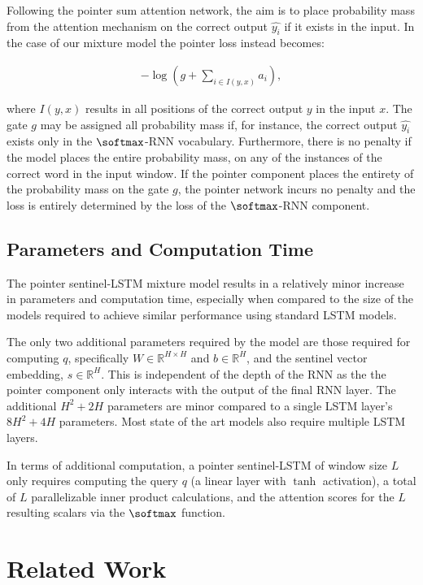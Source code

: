 Following the pointer sum attention network, the aim is to place probability mass from the attention mechanism on the correct output $\hat{y_{i}}$ if it exists in the input. In the case of our mixture model the pointer loss instead becomes:

\begin{align}
- \log \left( g + \sum_{i \in I(y, x)} a_i\right),
\end{align}

where $I(y, x)$ results in all positions of the correct output $y$ in the input $x$. The gate $g$ may be assigned all probability mass if, for instance, the correct output $\hat{y_{i}}$ exists only in the $\softmax$-RNN vocabulary. Furthermore, there is no penalty if the model places the entire probability mass, on any of the instances of the correct word in the input window. If the pointer component places the entirety of the probability mass on the gate $g$, the pointer network incurs no penalty and the loss is entirely determined by the loss of the $\softmax$-RNN component.

\subsection{Parameters and Computation Time}

The pointer sentinel-LSTM mixture model results in a relatively minor increase in parameters and computation time, especially when compared to the size of the models required to achieve similar performance using standard LSTM models.

The only two additional parameters required by the model are those required for computing $q$, specifically $W \in \mathbb{R}^{H \times H}$ and $b \in \mathbb{R}^{H}$, and the sentinel vector embedding, $s \in \mathbb{R}^{H}$.
This is independent of the depth of the RNN as the the pointer component only interacts with the output of the final RNN layer. The additional $H ^ 2 + 2H$ parameters are minor compared to a single LSTM layer's $8 H^2 + 4H$ parameters. Most state of the art models also require multiple LSTM layers.

In terms of additional computation, a pointer sentinel-LSTM of window size $L$ only requires computing the query $q$ (a linear layer with $\tanh$ activation), a total of $L$ parallelizable inner product calculations, and the attention scores for the $L$ resulting scalars via the $\softmax$ function.

\section{Related Work}

